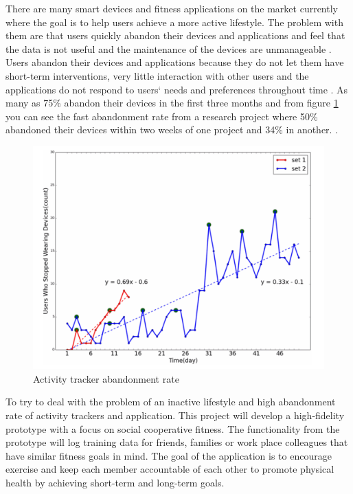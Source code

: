 There are many smart devices and fitness applications on the market currently where the goal is to help users achieve a more active lifestyle. The problem with them are that users quickly abandon their devices and applications and feel that the data is not useful and the maintenance of the devices are unmanageable \cite{Lazar2015}. Users abandon their devices and applications because they do not let them have short-term interventions, very little interaction with other users and the applications do not respond to users` needs and preferences throughout time \cite{Tong} . As many as 75\% abandon their devices in the first three months \cite{Baum} and from figure \ref{acttrack} you can see the fast abandonment rate from a research project where 50\% abandoned their devices within two weeks of one project and 34\% in another. \cite{Lee2017} .
\begin{figure}[H]
    \centering
    \includegraphics[scale=0.50]{figures/trackerAbandonment.png}
    \caption{Activity tracker abandonment rate \cite{Lee2017}}
    \label{acttrack}
\end{figure}

To try to deal with the problem of an inactive lifestyle and high abandonment rate of activity trackers and application. This project will develop a high-fidelity prototype with a focus on social cooperative fitness. The functionality from the prototype will log training data for friends, families or work place colleagues that have similar fitness goals in mind. The goal of the application is to encourage exercise and keep each member accountable of each other to promote physical health by achieving short-term and long-term goals.

